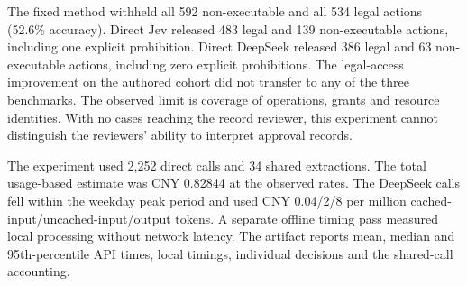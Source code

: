 The fixed method withheld all 592 non-executable and all 534 legal actions (52.6\% accuracy). Direct Jev released 483 legal and 139 non-executable actions, including one explicit prohibition. Direct DeepSeek released 386 legal and 63 non-executable actions, including zero explicit prohibitions. The legal-access improvement on the authored cohort did not transfer to any of the three benchmarks. The observed limit is coverage of operations, grants and resource identities. With no cases reaching the record reviewer, this experiment cannot distinguish the reviewers' ability to interpret approval records.

The experiment used 2,252 direct calls and 34 shared extractions. The total usage-based estimate was CNY 0.82844 at the observed rates. The DeepSeek calls fell within the weekday peak period and used CNY 0.04/2/8 per million cached-input/uncached-input/output tokens. A separate offline timing pass measured local processing without network latency. The artifact reports mean, median and 95th-percentile API times, local timings, individual decisions and the shared-call accounting.
\FloatBarrier
